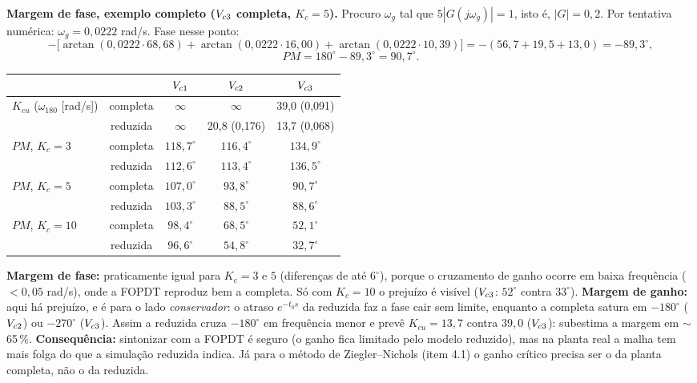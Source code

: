 \textbf{Margem de fase, exemplo completo ($V_{c3}$ completa, $K_c=5$).} Procuro $\omega_g$ tal que $5|G(j\omega_g)|=1$, isto é, $|G|=0{,}2$. Por tentativa numérica: $\omega_g=0{,}0222$ rad/s. Fase nesse ponto:
\[
-\big[\arctan(0{,}0222\cdot68{,}68)+\arctan(0{,}0222\cdot16{,}00)+\arctan(0{,}0222\cdot10{,}39)\big]=-(56{,}7+19{,}5+13{,}0)=-89{,}3^\circ,
\]
\[
PM=180^\circ-89{,}3^\circ=90{,}7^\circ .
\]
\begin{center}
\begin{tabular}{lcccc}\toprule & & $V_{c1}$ & $V_{c2}$ & $V_{c3}$\\\midrule
\multirow{2}{*}{$K_{cu}$ ($\omega_{180}$ [rad/s])} & completa & $\infty$ & $\infty$ & 39,0 (0,091)\\ & reduzida & $\infty$ & 20,8 (0,176) & 13,7 (0,068)\\\midrule
\multirow{2}{*}{$PM$, $K_c=3$} & completa & $118{,}7^\circ$ & $116{,}4^\circ$ & $134{,}9^\circ$\\ & reduzida & $112{,}6^\circ$ & $113{,}4^\circ$ & $136{,}5^\circ$\\\midrule
\multirow{2}{*}{$PM$, $K_c=5$} & completa & $107{,}0^\circ$ & $93{,}8^\circ$ & $90{,}7^\circ$\\ & reduzida & $103{,}3^\circ$ & $88{,}5^\circ$ & $88{,}6^\circ$\\\midrule
\multirow{2}{*}{$PM$, $K_c=10$} & completa & $98{,}4^\circ$ & $68{,}5^\circ$ & $52{,}1^\circ$\\ & reduzida & $96{,}6^\circ$ & $54{,}8^\circ$ & $32{,}7^\circ$\\\bottomrule
\end{tabular}\end{center}
\begin{just}\textbf{Margem de fase:} praticamente igual para $K_c=3$ e $5$ (diferenças de até $6^\circ$), porque o cruzamento de ganho ocorre em baixa frequência ($<0{,}05$ rad/s), onde a FOPDT reproduz bem a completa. Só com $K_c=10$ o prejuízo é visível ($V_{c3}$: $52^\circ$ contra $33^\circ$). \textbf{Margem de ganho:} aqui há prejuízo, e é para o lado \emph{conservador}: o atraso $e^{-t_0s}$ da reduzida faz a fase cair sem limite, enquanto a completa satura em $-180^\circ$ ($V_{c2}$) ou $-270^\circ$ ($V_{c3}$). Assim a reduzida cruza $-180^\circ$ em frequência menor e prevê $K_{cu}=13{,}7$ contra $39{,}0$ ($V_{c3}$): subestima a margem em $\sim$65\,\%. \textbf{Consequência:} sintonizar com a FOPDT é seguro (o ganho fica limitado pelo modelo reduzido), mas na planta real a malha tem mais folga do que a simulação reduzida indica. Já para o método de Ziegler--Nichols (item 4.1) o ganho crítico precisa ser o da planta completa, não o da reduzida.\end{just}
